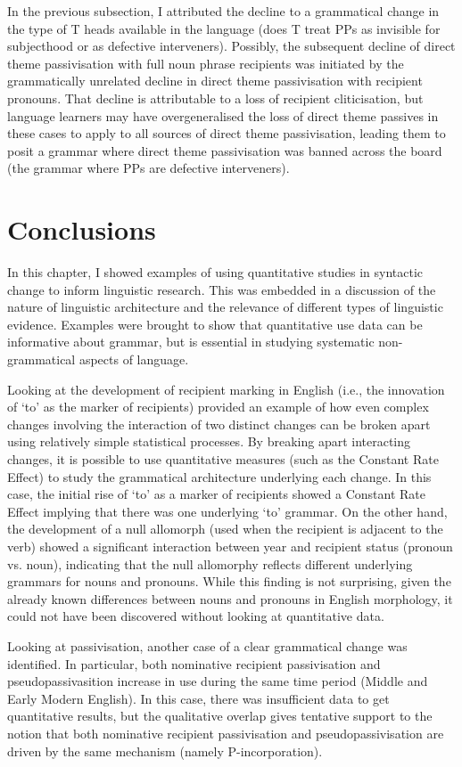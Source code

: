 	In the previous subsection, I attributed the decline to a grammatical change in the type of T heads available in the language (does T treat PPs as invisible for subjecthood or as defective interveners). Possibly, the subsequent decline of direct theme passivisation with full noun phrase recipients was initiated by the grammatically unrelated decline in direct theme passivisation with recipient pronouns. That decline is attributable to a loss of recipient cliticisation, but language learners may have overgeneralised the loss of direct theme passives in these cases to apply to all sources of direct theme passivisation, leading them to posit a grammar where direct theme passivisation was banned across the board (the grammar where PPs are defective interveners).

\section{Conclusions}
	In this chapter, I showed examples of using quantitative studies in syntactic change to inform linguistic research. This was embedded in a discussion of the nature of linguistic architecture and the relevance of different types of linguistic evidence. Examples were brought to show that quantitative use data can be informative about grammar, but is essential in studying systematic non-grammatical aspects of language.
	
	Looking at the development of recipient marking in English (i.e., the innovation of `to' as the marker of recipients) provided an example of how even complex changes involving the interaction of two distinct changes can be broken apart using relatively simple statistical processes. By breaking apart interacting changes, it is possible to use quantitative measures (such as the Constant Rate Effect) to study the grammatical architecture underlying each change. In this case, the initial rise of `to' as a marker of recipients showed a Constant Rate Effect implying that there was one underlying `to' grammar. On the other hand, the development of a null allomorph (used when the recipient is adjacent to the verb) showed a significant interaction between year and recipient status (pronoun vs. noun), indicating that the null allomorphy reflects different underlying grammars for nouns and pronouns. While this finding is not surprising, given the already known differences between nouns and pronouns in English morphology, it could not have been discovered without looking at quantitative data.
	
	Looking at passivisation, another case of a clear grammatical change was identified. In particular, both nominative recipient passivisation and pseudopassivasition increase in use during the same time period (Middle and Early Modern English). In this case, there was insufficient data to get quantitative results, but the qualitative overlap gives tentative support to the notion that both nominative recipient passivisation and pseudopassivisation are driven by the same mechanism (namely P-incorporation).

